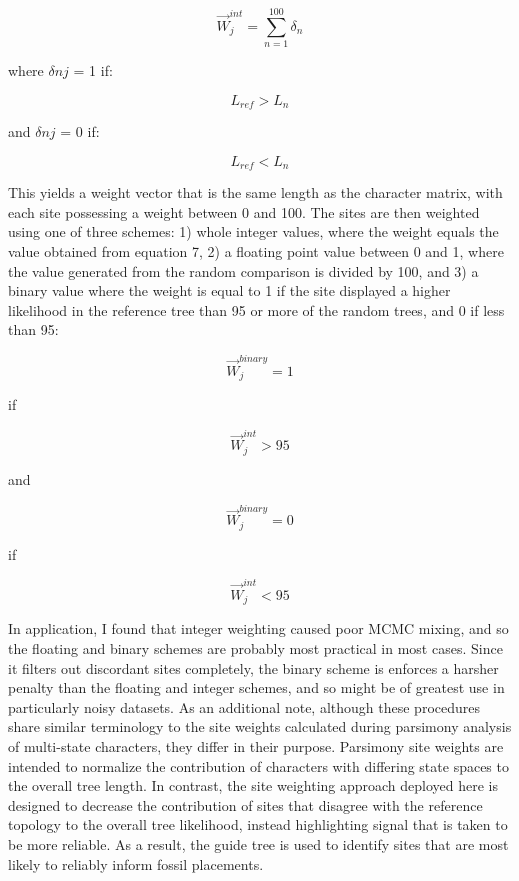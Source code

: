 \documentclass[12pt]{article}
\begin{document}
\begin{equation}
\overrightarrow{W}^{int}_j = \sum\limits_{n=1}^{100}\delta_n 
\end{equation}

where $\delta nj$ = 1 if:

\begin{equation}
L_{ref} > L_n 
\end{equation}

and $\delta nj$ = 0 if:

\begin{equation}
L_{ref} < L_n 
\end{equation}

This yields a weight vector that is the same length as the character
matrix, with each site possessing a weight between 0 and 100. The sites
are then weighted using one of three schemes: 1) whole integer values,
where the weight equals the value obtained from equation 7, 2) a
floating point value between 0 and 1, where the value generated from the
random comparison is divided by 100, and 3) a binary value where the
weight is equal to 1 if the site displayed a higher likelihood in the
reference tree than 95 or more of the random trees, and 0 if less than
95:

\begin{equation}
\overrightarrow{W}^{binary}_j = 1
\end{equation}

if 

\begin{equation}
\overrightarrow{W}^{int}_j > 95 
\end{equation}

and

\begin{equation}
\overrightarrow{W}^{binary}_j = 0
\end{equation}

if

\begin{equation}
\overrightarrow{W}^{int}_j <  95
\end{equation}

In application, I found that integer weighting caused poor MCMC mixing,
and so the floating and binary schemes are probably most practical in
most cases. Since it filters out discordant sites completely, the binary
scheme is enforces a harsher penalty than the floating and integer
schemes, and so might be of greatest use in particularly noisy datasets.
As an additional note, although these procedures share similar
terminology to the site weights calculated during parsimony analysis of
multi-state characters, they differ in their purpose. Parsimony site
weights are intended to normalize the contribution of characters with
differing state spaces to the overall tree length. In contrast, the site
weighting approach deployed here is designed to decrease the
contribution of sites that disagree with the reference topology to the
overall tree likelihood, instead highlighting signal that is taken to be
more reliable. As a result, the guide tree is used to identify sites
that are most likely to reliably inform fossil placements.
\end{document}
